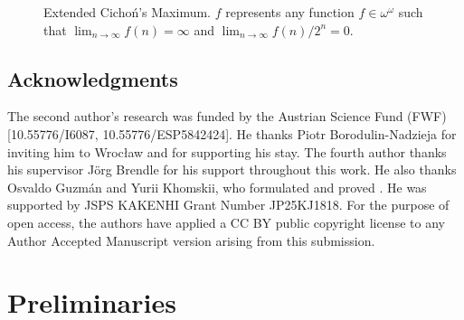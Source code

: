 \documentclass[a4paper,12pt]{amsart}
\theoremstyle{definition}
\numberwithin{thm}{section}
\numberwithin{equation}{section}
\newcommand{\oo}{{\omega}^\omega}
\begin{document}
\begin{figure}[h!]
        \caption{Extended Cicho\'{n}'s Maximum.   $f$ represents any function $f\in\oo$ such that $\textstyle\lim_{n\to\infty}f(n)=\infty$ and  $\textstyle\lim_{n\to\infty}f(n)/2^n=0$.}\label{fig:ext_CM}
    \end{figure}


    \subsection*{Acknowledgments}
    
    The second author's research was funded by the Austrian Science Fund (FWF) [10.55776/I6087, 10.55776/ESP5842424]. He thanks Piotr Borodulin-Nadzieja for inviting him to Wrocław and for supporting his stay.
    The fourth author thanks his supervisor J\"{o}rg Brendle for his support throughout this work. He also thanks Osvaldo Guzm\'{a}n and Yurii Khomskii, who formulated and proved . He was supported by JSPS KAKENHI Grant Number JP25KJ1818.
    For the purpose of open access, the authors have applied a CC BY public copyright license to any Author Accepted Manuscript version arising from this submission.


    \section{Preliminaries}\label{sec:Preliminaries}
\end{document}
